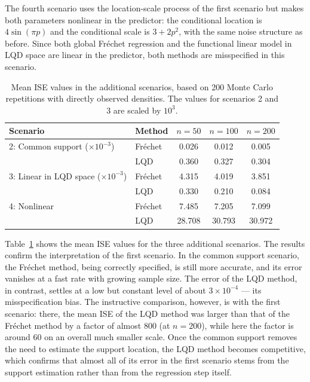 The fourth scenario uses the location-scale process of the first scenario but makes
both parameters nonlinear in the predictor: the conditional location is
$4\sin(\pi p)$ and the conditional scale is $3 + 2p^2$, with the same noise structure
as before. Since both global Fréchet regression and the functional linear model in
LQD space are linear in the predictor, both methods are misspecified in this
scenario.

\begin{table}[h!]
    \centering
    \begin{tabular}{llccc}
        \hline
        Scenario & Method & $n = 50$ & $n = 100$ & $n = 200$ \\
        \hline
        2: Common support ($\times 10^{-3}$)  & Fréchet & 0.026 & 0.012 & 0.005 \\
                                              & LQD     & 0.360 & 0.327 & 0.304 \\
        3: Linear in LQD space ($\times 10^{-3}$) & Fréchet & 4.315 & 4.019 & 3.851 \\
                                              & LQD     & 0.330 & 0.210 & 0.084 \\
        4: Nonlinear                          & Fréchet & 7.485 & 7.205 & 7.099 \\
                                              & LQD     & 28.708 & 30.793 & 30.972 \\
        \hline
    \end{tabular}
    \caption[Mean ISE values in additional scenarios]{Mean ISE values in the additional
    scenarios, based on 200 Monte Carlo repetitions with directly observed densities.
    The values for scenarios 2 and 3 are scaled by $10^{3}$.}
    \label{tab:mean_ise_values_additional}
\end{table}

Table~\ref{tab:mean_ise_values_additional} shows the mean ISE values for the three
additional scenarios. The results confirm the interpretation of the first scenario.
In the common support scenario, the Fréchet method, being correctly specified, is
still more accurate, and its error vanishes at a fast rate with growing sample size.
The error of the LQD method, in contrast, settles at a low but constant level of
about $3 \times 10^{-4}$ --- its misspecification bias. The instructive comparison,
however, is with the first scenario: there, the mean ISE of the LQD method was
larger than that of the Fréchet method by a factor of almost 800 (at $n = 200$),
while here the factor is around 60 on an overall much smaller scale. Once the
common support removes the need to estimate the support location, the LQD method
becomes competitive, which confirms that almost all of its error in the first
scenario stems from the support estimation rather than from the regression step
itself.

